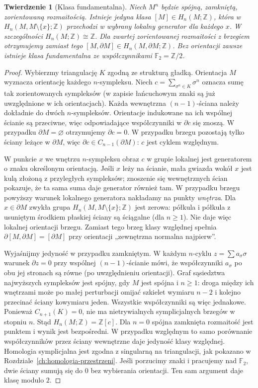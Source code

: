 \documentclass[11pt,a4paper,oneside]{report}
\newcommand{\Z}{\mathbb{Z}}
\theoremstyle{plain}
\newtheorem{twierdzenie}{Twierdzenie}[section]
\theoremstyle{definition}
\theoremstyle{remark}
\begin{document}
\begin{twierdzenie}[Klasa fundamentalna]
\label{thm:klasa-fundamentalna-16}
Niech $M^n$ będzie spójną, zamkniętą,
zorientowaną rozmaitością. Istnieje
jedyna klasa
$[M]\in H_n(M;\Z)$, która w
$H_n(M,M\setminus\{x\};\Z)$
przechodzi w wybrany lokalny
generator dla każdego $x$.
W szczególności $H_n(M;\Z)\cong\Z$.
Dla zwartej zorientowanej rozmaitości z brzegiem
otrzymujemy zamiast tego
$[M,\partial M]\in H_n(M,\partial M;\Z)$.
Bez orientacji zawsze istnieje
klasa fundamentalna ze
współczynnikami $\mathbb F_2=\Z/2$.
\end{twierdzenie}
\begin{proof}
Wybierzmy triangulację $K$ zgodną
ze strukturą gładką. Orientacja $M$
wyznacza orientację każdego
$n$-sympleksu. Niech
$c=\sum_{\sigma^n\in K}\sigma^n$
oznacza sumę tak zorientowanych
sympleksów (w zapisie łańcuchowym
znaki są już uwzględnione w ich
orientacjach). Każda wewnętrzna
$(n-1)$-ściana należy dokładnie
do dwóch $n$-sympleksów.
Orientacje indukowane na ich
wspólnej ścianie są przeciwne,
więc odpowiadające współczynniki
w $\partial c$ się znoszą.
W przypadku $\partial M=\varnothing$
otrzymujemy $\partial c=0$.
W przypadku brzegu pozostają tylko
ściany leżące w $\partial M$,
więc $\partial c\in C_{n-1}(\partial M)$:
$c$ jest cyklem względnym.

W punkcie $x$ we wnętrzu
$n$-sympleksu obraz $c$ w
grupie lokalnej jest generatorem
o znaku określonym orientacją.
Jeśli $x$ leży na ścianie,
mała gwiazda wokół $x$ jest
kulą złożoną z przyległych
sympleksów; znoszenie się
wewnętrznych ścian pokazuje,
że ta sama suma daje generator
również tam. W przypadku brzegu powyższy warunek lokalnego
generatora nakładamy na punkty \emph{wnętrza}.
Dla $x\in\partial M$ zwykła grupa
$H_n(M,M\setminus\{x\};\Z)$ jest zerowa:
półkula i półkula z usuniętym środkiem płaskiej ściany
są ściągalne (dla $n\geq1$). Nie daje więc lokalnej
orientacji brzegu. Zamiast tego brzeg klasy względnej
spełnia $\partial[M,\partial M]=[\partial M]$
przy orientacji „zewnętrzna normalna najpierw”.

Wyjaśnijmy jedyność w przypadku
zamkniętym. W każdym $n$-cyklu
$z=\sum a_\sigma\sigma$ warunek
$\partial z=0$ przy wspólnej
$(n-1)$-ścianie mówi, że
współczynniki $a_\sigma$ po obu
jej stronach są równe
(po uwzględnieniu orientacji).
Graf sąsiedztwa najwyższych
sympleksów jest spójny,
gdy $M$ jest spójna i $n\geq1$:
droga między ich wnętrzami
może po małej perturbacji
omijać szkielet wymiaru
$n-2$ i kolejno przecinać
ściany kowymiaru jeden.
Wszystkie współczynniki są
więc jednakowe. Ponieważ
$C_{n+1}(K)=0$, nie ma
nietrywialnych symplicjalnych
brzegów w stopniu $n$.
Stąd $H_n(M;\Z)=\Z[c]$. Dla $n=0$ spójna
zamknięta rozmaitość jest punktem i wynik jest bezpośredni.
W przypadku względnym to samo porównanie współczynników
przez ściany wewnętrzne daje jedyność klasy względnej.
Homologia symplicjalna jest
zgodna z singularną na
triangulacji, jak pokazano
w Rozdziale~\ref{ch:homologia-przestrzeni}.
Jeśli porzucimy znaki i pracujemy
nad $\mathbb F_2$, dwie ściany
sumują się do $0$ bez wybierania
orientacji. Ten sam argument
daje klasę modulo $2$.
\end{proof}
\end{document}
